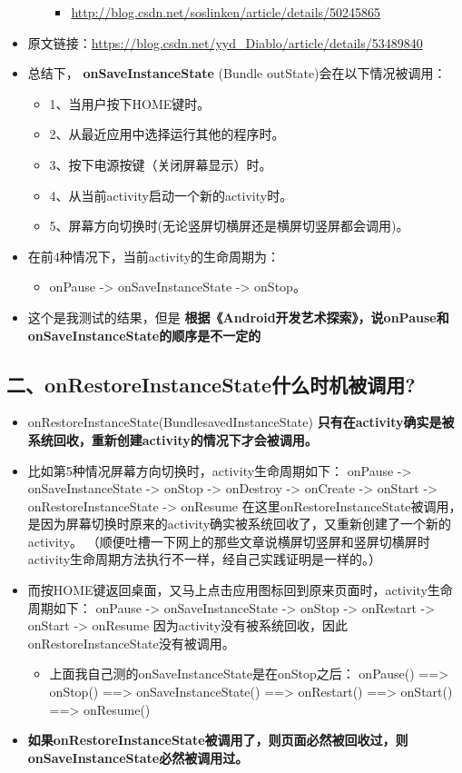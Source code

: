 \documentclass[9pt, b5paper]{article}
\begin{document}
\begin{itemize}
\begin{itemize}
\begin{itemize}
\item \url{http://blog.csdn.net/soslinken/article/details/50245865}
\end{itemize}
\end{itemize}
\item 原文链接：\url{https://blog.csdn.net/yyd_Diablo/article/details/53489840}
\item 总结下， \textbf{onSaveInstanceState} (Bundle outState)会在以下情况被调用：
\begin{itemize}
\item 1、当用户按下HOME键时。
\item 2、从最近应用中选择运行其他的程序时。
\item 3、按下电源按键（关闭屏幕显示）时。
\item 4、从当前activity启动一个新的activity时。
\item 5、屏幕方向切换时(无论竖屏切横屏还是横屏切竖屏都会调用)。
\end{itemize}
\item 在前4种情况下，当前activity的生命周期为：
\begin{itemize}
\item onPause -> onSaveInstanceState -> onStop。
\end{itemize}
\item 这个是我测试的结果，但是 \textbf{根据《Android开发艺术探索》，说onPause和onSaveInstanceState的顺序是不一定的}
\end{itemize}

\subsection{二、onRestoreInstanceState什么时机被调用?}
\label{sec-11-2}
\begin{itemize}
\item onRestoreInstanceState(BundlesavedInstanceState) \textbf{只有在activity确实是被系统回收，重新创建activity的情况下才会被调用。}
\item 比如第5种情况屏幕方向切换时，activity生命周期如下： onPause -> onSaveInstanceState -> onStop -> onDestroy -> onCreate -> onStart -> onRestoreInstanceState -> onResume 在这里onRestoreInstanceState被调用，是因为屏幕切换时原来的activity确实被系统回收了，又重新创建了一个新的activity。 （顺便吐槽一下网上的那些文章说横屏切竖屏和竖屏切横屏时activity生命周期方法执行不一样，经自己实践证明是一样的。）
\item 而按HOME键返回桌面，又马上点击应用图标回到原来页面时，activity生命周期如下： onPause -> onSaveInstanceState -> onStop -> onRestart -> onStart -> onResume 因为activity没有被系统回收，因此onRestoreInstanceState没有被调用。
\begin{itemize}
\item 上面我自己测的onSaveInstanceState是在onStop之后： onPause() ==> onStop() ==> onSaveInstanceState() ==> onRestart() ==> onStart() ==> onResume()
\end{itemize}
\item \textbf{如果onRestoreInstanceState被调用了，则页面必然被回收过，则onSaveInstanceState必然被调用过。}
\end{itemize}
\end{document}
